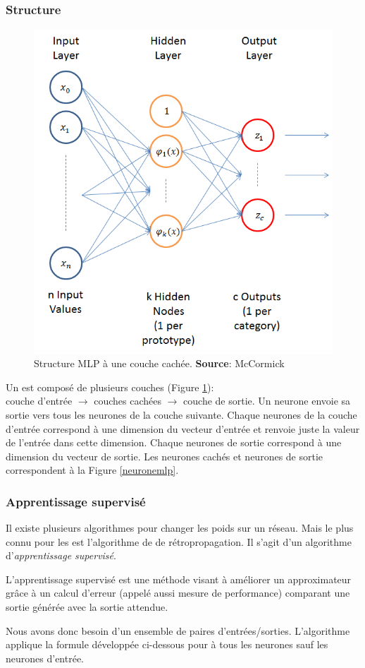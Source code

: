 \subsubsection{Structure}
\begin{figure}
 \centering
 \includegraphics[scale=0.5]{../figures/nnstruct.png}
 \caption{Structure MLP à une couche cachée. \textbf{Source}: McCormick\cite{RBFtuto}}
 \label{structuremlp}
\end{figure}
Un \mlp est composé de plusieurs couches (Figure \ref{structuremlp}):\\
couche d'entrée $\rightarrow$ couches cachées $\rightarrow$ couche de sortie.
Un neurone envoie sa sortie vers tous les neurones de la couche suivante.
Chaque neurones de la couche d'entrée correspond à une dimension du vecteur d'entrée et renvoie juste la valeur de l'entrée dans cette dimension.
Chaque neurones de sortie correspond à une dimension du vecteur de sortie.
Les neurones cachés et neurones de sortie correspondent à la Figure \ref{neuronemlp}.
\subsubsection{Apprentissage supervisé}\label{sec:appmlp}
Il existe plusieurs algorithmes pour changer les poids sur un réseau. Mais le plus connu pour les \mlp est l'algorithme de de rétropropagation.\cite{Haykin,Gauthier}
Il s'agit d'un algorithme d'\emph{apprentissage supervisé}.
\begin{definition}
L'apprentissage supervisé est une méthode visant à améliorer un approximateur grâce à un calcul d'erreur (appelé aussi mesure de performance\cite{Gauthier}) comparant une sortie générée avec la sortie attendue.
\end{definition}
Nous avons donc besoin d'un ensemble de paires d'entrées/sorties. L'algorithme applique la formule développée ci-dessous pour à tous les neurones sauf les neurones d'entrée.\\

